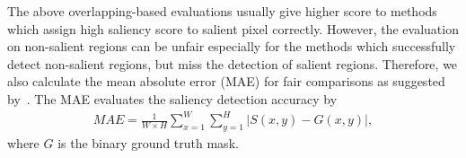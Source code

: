 \documentclass[10pt,twocolumn,letterpaper]{article}
\begin{document}
The above overlapping-based evaluations usually give higher score to methods which assign high saliency score to salient pixel correctly.
%
However, the evaluation on non-salient regions can be unfair especially for the methods which successfully detect non-salient regions, but miss the detection of salient regions.
%
Therefore, we also calculate the mean absolute error (MAE) for fair comparisons as suggested by~\cite{borji2015salient}.
%
The MAE evaluates the saliency detection accuracy by
\vspace{-1mm}
\begin{align}
MAE = \frac{1}{W\times H}\sum_{x=1}^{W}\sum_{y=1}^{H}|S(x,y)-G(x,y)|,
  \label{equ:equ3}
\end{align}
\vspace{-0.5mm}
where $G$ is the binary ground truth mask.
\end{document}
